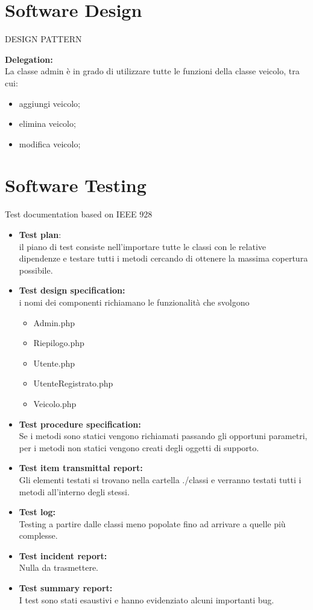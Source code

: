 \documentclass[12pt]{article}
\begin{document}
\section{Software Design}
  \begin{center}
    DESIGN PATTERN
  \end{center}


\textbf{Delegation:} \\ 
La classe admin è in grado di utilizzare tutte le funzioni della classe veicolo, tra cui:
\begin{itemize}
  \item aggiungi veicolo;
  \item elimina veicolo;
  \item modifica veicolo;
\end{itemize}

\section{Software Testing}
{Test documentation based on IEEE 928} \\
\begin{itemize}
\item \textbf{Test plan}: \\ il piano di test consiste nell’importare tutte le classi con le relative dipendenze e testare tutti i metodi cercando di ottenere la massima copertura possibile. 

\item \textbf{Test design specification:} \\ i nomi dei componenti richiamano le funzionalità che svolgono
\begin{itemize}
  \item Admin.php 
  \item Riepilogo.php
  \item Utente.php
  \item UtenteRegistrato.php 
  \item Veicolo.php
\end{itemize}
\item  \textbf{Test procedure specification:} \\
Se i metodi sono statici vengono richiamati passando gli opportuni parametri, per i metodi non statici vengono creati degli oggetti di supporto.

\item \textbf{Test item transmittal report:} \\
Gli elementi testati si trovano nella cartella ./classi e verranno testati tutti i metodi all’interno degli stessi.
\item \textbf{Test log:} \\
Testing a partire dalle classi meno popolate fino ad arrivare a quelle più complesse. 

\item \textbf{Test incident report:} \\
Nulla da trasmettere.
\item \textbf{Test summary report:} \\
I test sono stati esaustivi e hanno evidenziato alcuni importanti bug.
\end{itemize}
\end{document}
